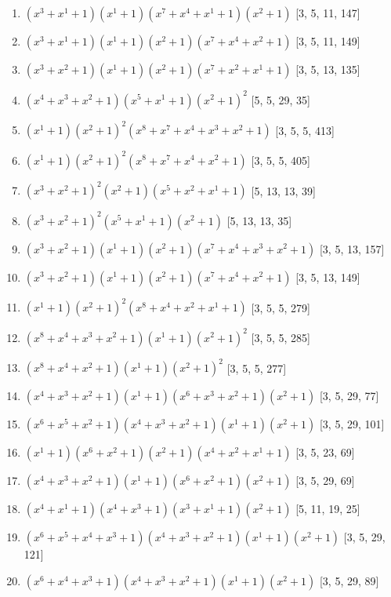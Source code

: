 \documentclass[10pt,twocolumn]{article}
\begin{document}
\begin{enumerate}
\item $(x^{3} + x^{1} + 1)(x^{1} + 1)(x^{7} + x^{4} + x^{1} + 1)(x^{2} + 1)$  [3, 5, 11, 147]
\item $(x^{3} + x^{1} + 1)(x^{1} + 1)(x^{2} + 1)(x^{7} + x^{4} + x^{2} + 1)$  [3, 5, 11, 149]
\item $(x^{3} + x^{2} + 1)(x^{1} + 1)(x^{2} + 1)(x^{7} + x^{2} + x^{1} + 1)$  [3, 5, 13, 135]
\item $(x^{4} + x^{3} + x^{2} + 1)(x^{5} + x^{1} + 1)(x^{2} + 1)^{2}$  [5, 5, 29, 35]
\item $(x^{1} + 1)(x^{2} + 1)^{2}(x^{8} + x^{7} + x^{4} + x^{3} + x^{2} + 1)$  [3, 5, 5, 413]
\item $(x^{1} + 1)(x^{2} + 1)^{2}(x^{8} + x^{7} + x^{4} + x^{2} + 1)$  [3, 5, 5, 405]
\item $(x^{3} + x^{2} + 1)^{2}(x^{2} + 1)(x^{5} + x^{2} + x^{1} + 1)$  [5, 13, 13, 39]
\item $(x^{3} + x^{2} + 1)^{2}(x^{5} + x^{1} + 1)(x^{2} + 1)$  [5, 13, 13, 35]
\item $(x^{3} + x^{2} + 1)(x^{1} + 1)(x^{2} + 1)(x^{7} + x^{4} + x^{3} + x^{2} + 1)$  [3, 5, 13, 157]
\item $(x^{3} + x^{2} + 1)(x^{1} + 1)(x^{2} + 1)(x^{7} + x^{4} + x^{2} + 1)$  [3, 5, 13, 149]
\item $(x^{1} + 1)(x^{2} + 1)^{2}(x^{8} + x^{4} + x^{2} + x^{1} + 1)$  [3, 5, 5, 279]
\item $(x^{8} + x^{4} + x^{3} + x^{2} + 1)(x^{1} + 1)(x^{2} + 1)^{2}$  [3, 5, 5, 285]
\item $(x^{8} + x^{4} + x^{2} + 1)(x^{1} + 1)(x^{2} + 1)^{2}$  [3, 5, 5, 277]
\item $(x^{4} + x^{3} + x^{2} + 1)(x^{1} + 1)(x^{6} + x^{3} + x^{2} + 1)(x^{2} + 1)$  [3, 5, 29, 77]
\item $(x^{6} + x^{5} + x^{2} + 1)(x^{4} + x^{3} + x^{2} + 1)(x^{1} + 1)(x^{2} + 1)$  [3, 5, 29, 101]
\item $(x^{1} + 1)(x^{6} + x^{2} + 1)(x^{2} + 1)(x^{4} + x^{2} + x^{1} + 1)$  [3, 5, 23, 69]
\item $(x^{4} + x^{3} + x^{2} + 1)(x^{1} + 1)(x^{6} + x^{2} + 1)(x^{2} + 1)$  [3, 5, 29, 69]
\item $(x^{4} + x^{1} + 1)(x^{4} + x^{3} + 1)(x^{3} + x^{1} + 1)(x^{2} + 1)$  [5, 11, 19, 25]
\item $(x^{6} + x^{5} + x^{4} + x^{3} + 1)(x^{4} + x^{3} + x^{2} + 1)(x^{1} + 1)(x^{2} + 1)$  [3, 5, 29, 121]
\item $(x^{6} + x^{4} + x^{3} + 1)(x^{4} + x^{3} + x^{2} + 1)(x^{1} + 1)(x^{2} + 1)$  [3, 5, 29, 89]

\end{enumerate}
\end{document}
